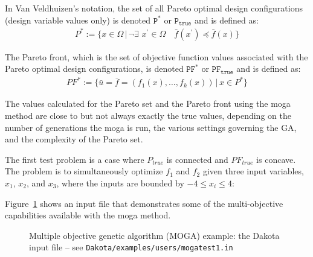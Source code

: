 In Van Veldhuizen's notation, the set of all Pareto optimal design
configurations (design variable values only) is denoted $\mathtt{P^*}$
or $\mathtt{P_{true}}$ and is defined as:
\begin{eqnarray*}
  P^*:=\{x\in\Omega\,|\,\neg\exists\,\,
  x^\prime\in\Omega\quad\bar{f}(x^\prime)\preceq\bar{f}(x)\}
\end{eqnarray*}
 
The Pareto front, which is the set of objective function values
associated with the Pareto optimal design configurations, is denoted
$\mathtt{PF^*}$ or $\mathtt{PF_{true}}$ and is defined as:
\begin{eqnarray*}
  PF^*:=\{\bar{u}=\bar{f}=(f_1(x),\ldots,f_k(x))\,|\, x\in P^*\}
\end{eqnarray*}
 
The values calculated for the Pareto set and the Pareto front using
the moga method are close to but not always exactly the true values,
depending on the number of generations the moga is run, the various
settings governing the GA, and the complexity of the Pareto set.
 
The first test problem is a case where $P_{true}$ is connected and
$PF_{true}$ is concave. The problem is to simultaneously optimize
$f_1$ and $f_2$ given three input variables, $x_1$, $x_2$, and $x_3$,
where the inputs are bounded by $-4 \leq x_{i} \leq 4$:
 
Figure~\ref{opt:additional:multiobjective:example2:moga1inp} shows an
input file that demonstrates some of the multi-objective capabilities
available with the moga method.
\begin{figure}[htp!]
  \centering
  \begin{bigbox}
    \begin{small}
    \end{small}
  \end{bigbox}
  \caption{Multiple objective genetic algorithm (MOGA) example: the
    Dakota input file --
see \texttt{Dakota/examples/users/mogatest1.in} }
  \label{opt:additional:multiobjective:example2:moga1inp}
\end{figure}
 
